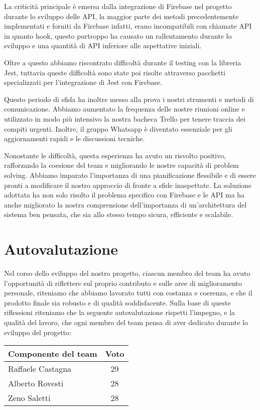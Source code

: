 \documentclass[11pt, a4paper]{article}
\theoremstyle{definition}
\begin{document}
La criticità principale è emersa dalla integrazione di Firebase nel progetto durante lo sviluppo delle API, la maggior parte dei metodi precedentemente implementati e forniti da Firebase infatti, erano incompatibili con chiamate API in quanto hook, questo purtroppo ha causato un rallentamento durante lo sviluppo e una quantità di API inferiore alle aspettative iniziali.

Oltre a questo abbiamo riscontrato difficoltà durante il testing con la libreria Jest, tuttavia queste difficoltà sono state poi risolte attraverso pacchetti specializzati per l’integrazione di Jest con Firebase.


Questo periodo di sfida ha inoltre messo alla prova i nostri strumenti e metodi di comunicazione. Abbiamo aumentato la frequenza delle nostre riunioni online e utilizzato in modo più intensivo la nostra bacheca Trello per tenere traccia dei compiti urgenti. Inoltre, il gruppo Whatsapp è diventato essenziale per gli aggiornamenti rapidi e le discussioni tecniche.

Nonostante le difficoltà, questa esperienza ha avuto un risvolto positivo, rafforzando la coesione del team e migliorando le nostre capacità di problem solving. Abbiamo imparato l'importanza di una pianificazione flessibile e di essere pronti a modificare il nostro approccio di fronte a sfide inaspettate. La soluzione adottata ha non solo risolto il problema specifico con Firebase e le API ma ha anche migliorato la nostra comprensione dell'importanza di un'architettura del sistema ben pensata, che sia allo stesso tempo sicura, efficiente e scalabile.



\section{Autovalutazione}
Nel corso dello sviluppo del nostro progetto, ciascun membro del team ha avuto l'opportunità di riflettere sul proprio contributo e sulle aree di miglioramento personale, riteniamo che abbiamo lavorato tutti con costanza e coerenza, e che il prodotto finale sia robusto e di qualità soddisfacente.
Sulla base di queste riflessioni riteniamo che la seguente autovalutazione rispetti l’impegno, e la qualità del lavoro, che ogni membro del team pensa di aver dedicato durante lo sviluppo del progetto:

\begin{center}
    \begin{tabularx}{0.5\textwidth}{|X||c|}
        \hline
        \cellcolor{red!70}Componente del team & \cellcolor{red!70}Voto\\
        \hline
        Raffaele Castagna & 29\\
        \hline
        Alberto Rovesti & 28\\
        \hline
        Zeno Saletti & 28\\
        \hline
    \end{tabularx}
\end{center}
\end{document}
